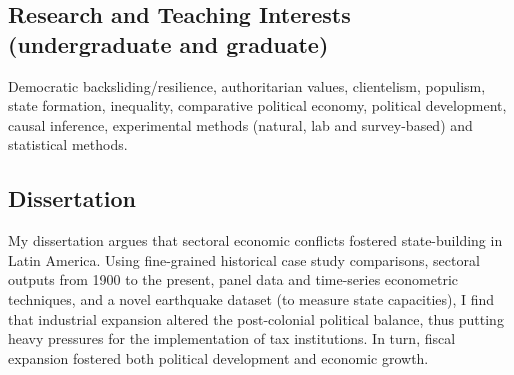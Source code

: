 \subsection*{Research and Teaching Interests (undergraduate and graduate)}

Democratic backsliding/resilience, authoritarian values, clientelism, populism, state formation, inequality, comparative political economy, political development, causal inference, experimental methods (natural, lab and survey-based) and statistical methods.

\subsection*{Dissertation}

	My dissertation argues that sectoral economic conflicts fostered state-building in Latin America. Using fine-grained historical case study comparisons, sectoral outputs from 1900 to the present, panel data and time-series econometric techniques, and a novel earthquake dataset (to measure state capacities), I find that industrial expansion altered the post-colonial political balance, thus putting heavy pressures for the implementation of tax institutions. In turn, fiscal expansion fostered both political development and economic growth.
